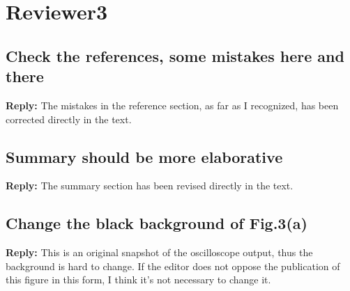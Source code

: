 \documentclass[]{article}
\begin{document}
\section{Reviewer3}
\subsection{Check the references, some mistakes here and there}
\textbf{Reply:}\newline
The mistakes in the reference section, as far as I recognized, has been corrected directly in the text.

\subsection{Summary should be more elaborative}
\textbf{Reply:}\newline
The summary section has been revised directly in the text.

\subsection{Change the black background of Fig.3(a)}
\textbf{Reply:}\newline
This is an original snapshot of the oscilloscope output, thus the background is hard to change. If the editor does not oppose the publication of this figure in this form, I think it's not necessary to change it.
\end{document}
